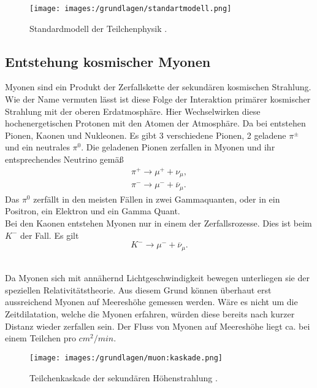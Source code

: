 \begin{figure}[H]
    \centering
    \texttt{[image: images:/grundlagen/standartmodell.png]}
    \caption{ Standardmodell der Teilchenphysik   \cite{standardmodell}.}
    \label{fig:standartmodell}
\end{figure}




\subsection{Entstehung kosmischer Myonen} \label{myon_entstehung}
Myonen sind ein Produkt der Zerfallskette der sekundären kosmischen Strahlung. Wie der Name vermuten lässt ist diese Folge der Interaktion primärer kosmischer Strahlung mit der oberen Erdatmosphäre.
Hier Wechselwirken diese hochenergetischen Protonen mit den Atomen der Atmosphäre.
Da bei entstehen Pionen, Kaonen und Nukleonen. 
Es gibt 3 verschiedene Pionen, 2 geladene $\pi^{\pm}$ und ein neutrales $\pi^0$. 
Die geladenen Pionen zerfallen in Myonen und ihr entsprechendes Neutrino gemäß 
\begin{align}
    \pi^+ \rightarrow  \mu^+ + \nu_{\mu},\\
    \pi^- \rightarrow  \mu^- + \overline{\nu}_{\mu}.
\end{align} 
Das $\pi^0$ zerfällt in den meisten Fällen in zwei Gammaquanten, oder in ein Positron, ein Elektron und ein Gamma Quant.\\
Bei den Kaonen entstehen Myonen nur in einem der Zerfallsrozesse.
Dies ist beim $K^-$ der Fall.
Es gilt 
\begin{equation}
    K^- \rightarrow \mu^- + \overline{\nu}_{\mu}.
\end{equation}
\\
\newline

Da Myonen sich mit annähernd Lichtgeschwindigkeit bewegen unterliegen sie der speziellen Relativitätstheorie. 
Aus diesem Grund können überhaut erst aussreichend Myonen auf Meereshöhe gemessen werden. 
Wäre es nicht um die Zeitdilatation, welche die Myonen erfahren, würden diese bereits nach kurzer Distanz wieder zerfallen sein. %
Der Fluss von Myonen auf Meereshöhe liegt ca. bei einem Teilchen pro $cm^2/min$. %


\begin{figure}[H]
    \centering
    \texttt{[image: images:/grundlagen/muon:kaskade.png]}
    \caption{ Teilchenkaskade der sekundären Höhenstrahlung   \cite{höhenstrahlung}.}
    \label{fig:höhen_strahlung}
\end{figure}




